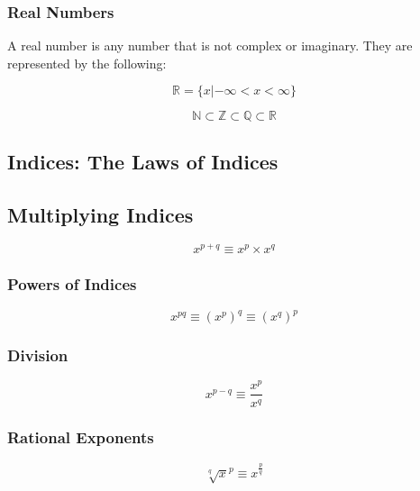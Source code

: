 \documentclass{article}
\begin{document}
\subsubsection{Real Numbers}
A real number is any number that is not complex or imaginary. They are represented by the following:

\begin{equation}
	\label{simple_equation}
	\mathbb{R} = \{x | -\infty <  x <\infty\}
\end{equation}

\begin{equation}
	\label{simple_equation}
	\mathbb{N} \subset \mathbb{Z} \subset \mathbb{Q} \subset \mathbb{R}
\end{equation}

\subsection{Indices: The Laws of Indices}

\subsection{Multiplying Indices}
\begin{equation}
	\label{simple_equation}
	x^{p + q} \equiv x^{p} \times x^{q}
\end{equation}

\subsubsection{Powers of Indices}

\begin{equation}
	\label{simple_equation}
	x^{pq} \equiv (x^{p})^{q} \equiv (x^{q})^{p} 
\end{equation}

\subsubsection{Division}

\begin{equation}
	\label{simple_equation}
	x^{p - q} \equiv \frac{x^{p}}{x^{q}}
\end{equation}

\subsubsection{Rational Exponents}

\begin{equation}
	\label{simple_equation}
	\sqrt[q]{x}^{p} \equiv x^{\frac{p}{q}}
\end{equation}
\end{document}
